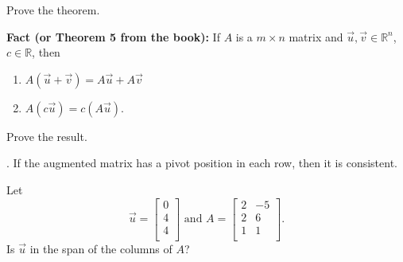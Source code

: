 \begin{enumerate}
\Problem Prove the theorem.

\newpage

{\bf Fact (or Theorem 5 from the book):} If $A$ is a $m \times n$ matrix and $\vec{u}, \vec{v} \in \mathbb{R}^n$, $c\in \mathbb{R}$, then
\begin{enumerate}
\item $A(\vec{u} +\vec{v})=A\vec{u} +A\vec{v}$
\item $A(c \vec{u}) =c (A\vec{u}).$
\end{enumerate}

\Problem Prove the result.

\vfill

. If the augmented matrix has a pivot position in each row, then it is consistent.

\vfill

\Problem Let $$\vec{u} =\begin{bmatrix} 0 \\ 4 \\ 4\\ \end{bmatrix} \text{ and } A=\begin{bmatrix} 2 & -5\\ 2 & 6\\ 1 & 1\\ \end{bmatrix}.$$ Is $\vec{u}$ in the span of the columns of $A$?

\vfill


\end{enumerate}


